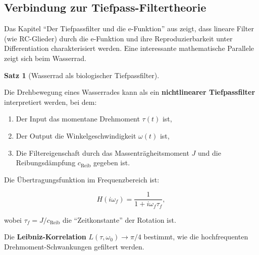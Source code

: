 \documentclass[a4paper,12pt]{article}
\theoremstyle{definition}
\newtheorem{satz}{Satz}
\begin{document}
\subsection{Verbindung zur Tiefpass-Filtertheorie}

Das Kapitel ``Der Tiefpassfilter und die e-Funktion'' aus \cite{lowp_full} zeigt, dass lineare Filter (wie RC-Glieder) durch die e-Funktion und ihre Reproduzierbarkeit unter Differentiation charakterisiert werden. Eine interessante mathematische Parallele zeigt sich beim Wasserrad.

\begin{satz}[Wasserrad als biologischer Tiefpassfilter]
  \label{satz:wasserrad_tiefpass}
  
  Die Drehbewegung eines Wasserrades kann als ein \textbf{nichtlinearer Tiefpassfilter} interpretiert werden, bei dem:
  
  \begin{enumerate}
    \item Der Input das momentane Drehmoment $\tau(t)$ ist,
    \item Der Output die Winkelgeschwindigkeit $\omega(t)$ ist,
    \item Die Filtereigenschaft durch das Massenträgheitsmoment $J$ und die Reibungsdämpfung $c_{\text{Reib}}$ gegeben ist.
  \end{enumerate}
  
  Die Übertragungsfunktion im Frequenzbereich ist:
  
  \begin{equation}
    H(i\omega_f) = \frac{1}{1 + i\omega_f \tau_f},
    \label{eq:tiefpass_h_iomega}
  \end{equation}
  
  wobei $\tau_f = J / c_{\text{Reib}}$ die ``Zeitkonstante'' der Rotation ist.
  
  Die \textbf{Leibniz-Korrelation} $L(\tau, \omega_0) \to \pi/4$ bestimmt, wie die hochfrequenten Drehmoment-Schwankungen gefiltert werden.
\end{satz}
\end{document}
